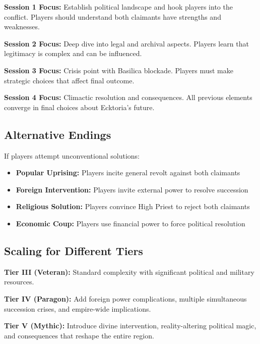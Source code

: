 \documentclass[11pt]{article}
\begin{document}
\textbf{Session 1 Focus:} Establish political landscape and hook players into the conflict. Players should understand both claimants have strengths and weaknesses.

\textbf{Session 2 Focus:} Deep dive into legal and archival aspects. Players learn that legitimacy is complex and can be influenced.

\textbf{Session 3 Focus:} Crisis point with Basilica blockade. Players must make strategic choices that affect final outcome.

\textbf{Session 4 Focus:} Climactic resolution and consequences. All previous elements converge in final choices about Ecktoria's future.

\subsection{Alternative Endings}

If players attempt unconventional solutions:
\begin{itemize}
\item \textbf{Popular Uprising:} Players incite general revolt against both claimants
\item \textbf{Foreign Intervention:} Players invite external power to resolve succession
\item \textbf{Religious Solution:} Players convince High Priest to reject both claimants
\item \textbf{Economic Coup:} Players use financial power to force political resolution
\end{itemize}

\subsection{Scaling for Different Tiers}

\textbf{Tier III (Veteran):} Standard complexity with significant political and military resources.

\textbf{Tier IV (Paragon):} Add foreign power complications, multiple simultaneous succession crises, and empire-wide implications.

\textbf{Tier V (Mythic):} Introduce divine intervention, reality-altering political magic, and consequences that reshape the entire region.
\end{document}
